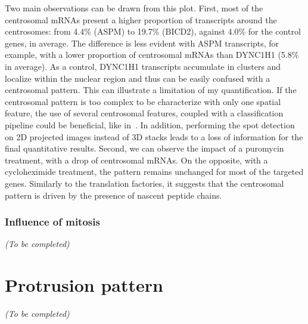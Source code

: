 Two main observations can be drawn from this plot.
First, most of the centrosomal \ac{mRNA}s present a higher proportion of transcripts around the centrosomes: from 4.4\% (ASPM) to 19.7\% (BICD2), against 4.0\% for the control genes, in average.
The difference is less evident with ASPM transcripts, for example, with a lower proportion  of centrosomal \ac{mRNA}s than DYNC1H1 (5.8\% in average).
As a control, DYNC1H1 transcripts accumulate in clusters and localize within the nuclear region and thus can be easily confused with a centrosomal pattern.
This can illustrate a limitation of my quantification.
If the centrosomal pattern is too complex to be characterize with only one spatial feature, the use of several centrosomal features, coupled with a classification pipeline could be beneficial, like in~\cite{CHOUAIB_2020}.
In addition, performing the spot detection on 2D projected images instead of 3D stacks leads to a loss of information for the final quantitative results.
Second, we can observe the impact of a puromycin treatment, with a drop of centrosomal \ac{mRNA}s.
On the opposite, with a cycloheximide treatment, the pattern remains unchanged for most of the targeted genes.
Similarly to the translation factories, it suggests that the centrosomal pattern is driven by the presence of nascent peptide chains.

\subsubsection{Influence of mitosis}

\begin{center}
	\textit{(To be completed)}
\end{center}


\section{Protrusion pattern}
\label{sec:protrusion}

\begin{center}
	\textit{(To be completed)}
\end{center}

